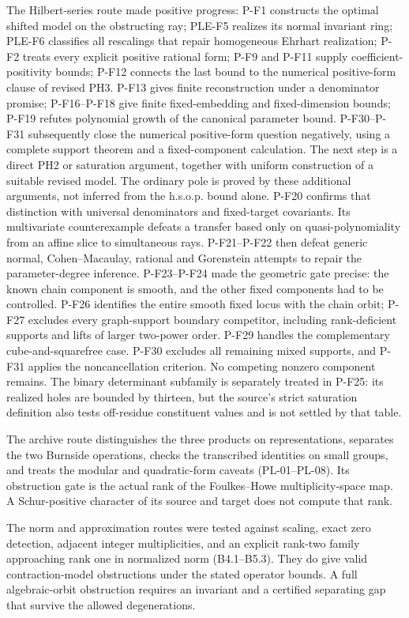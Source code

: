 \documentclass[11pt,a4paper]{article}
\begin{document}
The Hilbert-series route made positive progress: P-F1 constructs the
optimal shifted model on the obstructing ray; PLE-F5 realizes its normal
invariant ring; PLE-F6 classifies all rescalings that repair homogeneous
Ehrhart realization; P-F2 treats every explicit positive rational form;
P-F9 and P-F11 supply coefficient-positivity bounds; P-F12 connects the
last bound to the numerical positive-form clause of revised PH3.
P-F13 gives finite reconstruction under a denominator promise;
P-F16--P-F18 give finite fixed-embedding and fixed-dimension bounds;
P-F19 refutes polynomial growth of the canonical parameter bound.
P-F30--P-F31 subsequently close the numerical positive-form question
negatively, using a complete support theorem and a fixed-component
calculation. The next step is a direct PH2 or saturation argument,
together with uniform construction of a suitable revised model.
The ordinary pole is proved by these additional arguments, not
inferred from the h.s.o.p. bound alone.
P-F20 confirms that distinction with universal denominators and
fixed-target covariants. Its multivariate counterexample defeats a
transfer based only on quasi-polynomiality from an affine slice to
simultaneous rays. P-F21--P-F22 then defeat generic normal,
Cohen--Macaulay, rational and Gorenstein attempts to repair the
parameter-degree inference. P-F23--P-F24 made the geometric gate precise: the known chain
component is smooth, and the other fixed components had to be
controlled. P-F26 identifies the entire smooth fixed locus with
the chain orbit; P-F27 excludes every graph-support boundary
competitor, including rank-deficient supports and lifts of larger
two-power order. P-F29 handles the complementary cube-and-squarefree
case. P-F30 excludes all remaining mixed supports, and P-F31 applies
the noncancellation criterion. No competing nonzero component remains. The binary determinant subfamily is separately treated
in P-F25: its realized holes are bounded by thirteen, but the
source's strict saturation definition also tests off-residue
constituent values and is not settled by that table.

The archive route distinguishes the three products on representations,
separates the two Burnside operations, checks the transcribed identities
on small groups, and treats the modular and quadratic-form caveats
(PL-01--PL-08). Its obstruction gate is the actual rank of the
Foulkes--Howe multiplicity-space map. A Schur-positive character of its
source and target does not compute that rank.

The norm and approximation routes were tested against scaling, exact
zero detection, adjacent integer multiplicities, and an explicit rank-two
family approaching rank one in normalized norm (B4.1--B5.3). They do give
valid contraction-model obstructions under the stated operator bounds.
A full algebraic-orbit obstruction requires an invariant and a certified
separating gap that survive the allowed degenerations.
\end{document}
